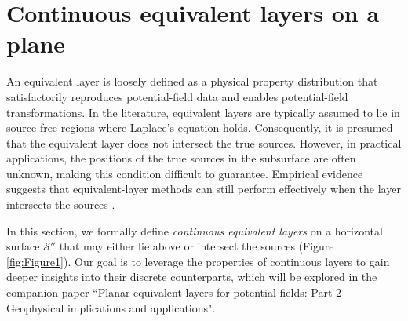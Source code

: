 \section{Continuous equivalent layers on a plane}
\label{eq:planar_eqlayer}

An equivalent layer is loosely defined as a physical property distribution that satisfactorily 
reproduces potential-field data and enables potential-field transformations. 
In the literature, equivalent layers are typically assumed to lie in source-free regions where 
Laplace’s equation holds. Consequently, it is presumed that the equivalent layer does not intersect 
the true sources. However, in practical applications, the positions of the true sources in the subsurface 
are often unknown, making this condition difficult to guarantee.
Empirical evidence suggests that equivalent-layer methods can still perform effectively 
when the layer intersects the sources \citep[e.g.,][]{gonzalez_etal2022}.

In this section, we formally define \textit{continuous equivalent layers} 
on a horizontal surface $\mathcal{S}''$ that may either lie above or intersect the sources (Figure \ref{fig:Figure1}). 
Our goal is to leverage the properties of continuous layers to gain deeper insights into their discrete counterparts, 
which will be explored in the companion paper 
``Planar equivalent layers for potential fields: Part 2 -- Geophysical implications and applications".

